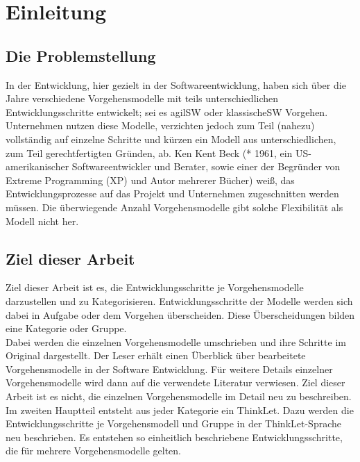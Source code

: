 
\chapter{Einleitung} %
\label{chp:einleitung} %



\section{Die Problemstellung}
\label{sec:einleitung_problemstellung}
In der Entwicklung, hier gezielt in der Softwareentwicklung, haben sich über die
Jahre verschiedene Vorgehensmodelle mit teils unterschiedlichen Entwicklungsschritte
entwickelt; sei es \gls{agilSW} oder \gls{klassischeSW} Vorgehen.
Unternehmen nutzen diese Modelle, verzichten jedoch zum Teil (nahezu)
vollständig auf einzelne Schritte und kürzen ein Modell aus unterschiedlichen,
zum Teil gerechtfertigten Gründen, ab. Ken Kent Beck (* 1961, ein
US-amerikanischer Softwareentwickler und Berater, sowie  einer der Begründer von
Extreme Programming (XP) und Autor mehrerer Bücher) weiß, das
Entwicklungsprozesse auf das Projekt und Unternehmen zugeschnitten werden
müssen. Die überwiegende Anzahl Vorgehensmodelle gibt solche Flexibilität als
Modell nicht her.


\section{Ziel dieser Arbeit}
Ziel dieser Arbeit ist es, die Entwicklungsschritte je Vorgehensmodelle
darzustellen und zu Kategorisieren. Entwicklungsschritte der Modelle werden
sich dabei in Aufgabe oder dem Vorgehen überscheiden. Diese Überscheidungen
bilden eine Kategorie oder Gruppe.
\\
Dabei werden die einzelnen Vorgehensmodelle umschrieben und ihre
Schritte im Original dargestellt. Der Leser erhält einen Überblick über
bearbeitete Vorgehensmodelle in der Software Entwicklung. Für weitere Details
einzelner Vorgehensmodelle wird dann auf die verwendete Literatur verwiesen.
Ziel dieser Arbeit ist es nicht, die einzelnen Vorgehensmodelle im Detail neu zu
beschreiben.
\\

Im zweiten Hauptteil entsteht aus jeder Kategorie ein \Gls{ThinkLet}.
Dazu werden die Entwicklungsschritte je Vorgehensmodell und Gruppe in der
\Gls{ThinkLet-Sprache} neu beschrieben. Es entstehen so einheitlich beschriebene
Entwicklungsschritte, die für mehrere Vorgehensmodelle gelten.

